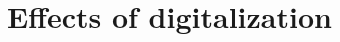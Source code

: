 \documentclass[a4]{scrartcl}
\begin{document}
	














	
	\section{Effects of digitalization}
	
	
\end{document}
